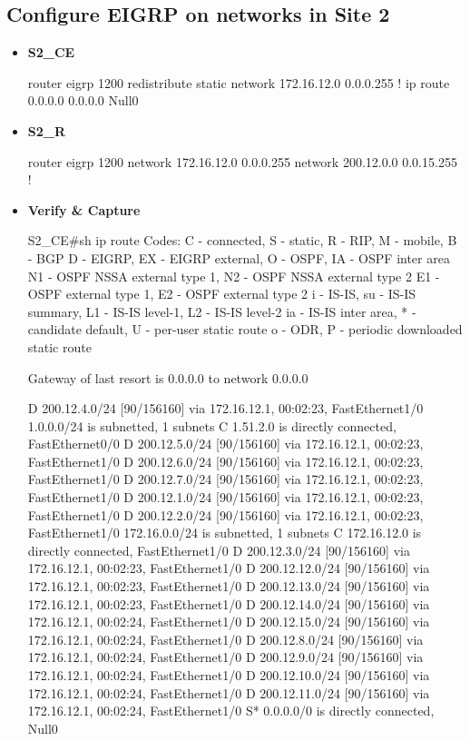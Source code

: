 \documentclass[10pt]{article}
\begin{document}
\subsection{Configure EIGRP on networks in Site 2} %
\label{sub:configure_eigrp_on_networks_in_site_2}
\begin{itemize}
	\item {\bf S2\_CE}
	\begin{verbatim*}
		router eigrp 1200
		 redistribute static
		 network 172.16.12.0 0.0.0.255
		!
		ip route 0.0.0.0 0.0.0.0 Null0
	\end{verbatim*}
	\item {\bf S2\_R}
	\begin{verbatim*}
		router eigrp 1200
		 network 172.16.12.0 0.0.0.255
		 network 200.12.0.0 0.0.15.255
		!
	\end{verbatim*}
	\item {\bf Verify \& Capture}
	\begin{verbatim*}
		S2_CE#sh ip route
		Codes: C - connected, S - static, R - RIP, M - mobile, B - BGP
		       D - EIGRP, EX - EIGRP external, O - OSPF, IA - OSPF inter area
		       N1 - OSPF NSSA external type 1, N2 - OSPF NSSA external type 2
		       E1 - OSPF external type 1, E2 - OSPF external type 2
		       i - IS-IS, su - IS-IS summary, L1 - IS-IS level-1, L2 - IS-IS level-2
		       ia - IS-IS inter area, * - candidate default, U - per-user static route
		       o - ODR, P - periodic downloaded static route

		Gateway of last resort is 0.0.0.0 to network 0.0.0.0

		D    200.12.4.0/24 [90/156160] via 172.16.12.1, 00:02:23, FastEthernet1/0
		     1.0.0.0/24 is subnetted, 1 subnets
		C       1.51.2.0 is directly connected, FastEthernet0/0
		D    200.12.5.0/24 [90/156160] via 172.16.12.1, 00:02:23, FastEthernet1/0
		D    200.12.6.0/24 [90/156160] via 172.16.12.1, 00:02:23, FastEthernet1/0
		D    200.12.7.0/24 [90/156160] via 172.16.12.1, 00:02:23, FastEthernet1/0
		D    200.12.1.0/24 [90/156160] via 172.16.12.1, 00:02:23, FastEthernet1/0
		D    200.12.2.0/24 [90/156160] via 172.16.12.1, 00:02:23, FastEthernet1/0
		     172.16.0.0/24 is subnetted, 1 subnets
		C       172.16.12.0 is directly connected, FastEthernet1/0
		D    200.12.3.0/24 [90/156160] via 172.16.12.1, 00:02:23, FastEthernet1/0
		D    200.12.12.0/24 [90/156160] via 172.16.12.1, 00:02:23, FastEthernet1/0
		D    200.12.13.0/24 [90/156160] via 172.16.12.1, 00:02:23, FastEthernet1/0
		D    200.12.14.0/24 [90/156160] via 172.16.12.1, 00:02:24, FastEthernet1/0
		D    200.12.15.0/24 [90/156160] via 172.16.12.1, 00:02:24, FastEthernet1/0
		D    200.12.8.0/24 [90/156160] via 172.16.12.1, 00:02:24, FastEthernet1/0
		D    200.12.9.0/24 [90/156160] via 172.16.12.1, 00:02:24, FastEthernet1/0
		D    200.12.10.0/24 [90/156160] via 172.16.12.1, 00:02:24, FastEthernet1/0
		D    200.12.11.0/24 [90/156160] via 172.16.12.1, 00:02:24, FastEthernet1/0
		S*   0.0.0.0/0 is directly connected, Null0



\end{verbatim*}
\end{itemize}
\end{document}
